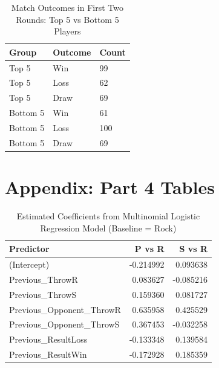 \documentclass[12pt]{article}
\begin{document}
\begin{table}[H]
\centering
\small
\caption{Match Outcomes in First Two Rounds: Top 5 vs Bottom 5 Players}
\label{tab:first2_outcomes_t5b5}
\begin{tabular}{lll}
\toprule
\textbf{Group} & \textbf{Outcome} & \textbf{Count} \\
\midrule
Top 5     & Win  & 99 \\
Top 5     & Loss & 62 \\
Top 5     & Draw & 69 \\
Bottom 5  & Win  & 61 \\
Bottom 5  & Loss & 100 \\
Bottom 5  & Draw & 69 \\
\bottomrule
\end{tabular}
\end{table}

\newpage

\section*{Appendix: Part 4 Tables}

\begin{table}[H]
\centering

\caption{Estimated Coefficients from Multinomial Logistic Regression Model (Baseline = Rock)}
\label{tab:model_coefficients_part4}
\begin{tabular}{lrr}
\toprule
\textbf{Predictor} & \textbf{P vs R} & \textbf{S vs R} \\
\midrule
(Intercept) & -0.214992 & 0.093638 \\
Previous\_ThrowR & 0.083627 & -0.085216 \\
Previous\_ThrowS & 0.159360 & 0.081727 \\
Previous\_Opponent\_ThrowR & 0.635958 & 0.425529 \\
Previous\_Opponent\_ThrowS & 0.367453 & -0.032258 \\
Previous\_ResultLoss & -0.133348 & 0.139584 \\
Previous\_ResultWin & -0.172928 & 0.185359 \\
\bottomrule
\end{tabular}
\end{table}


\newpage
{}
{}

\end{document}
